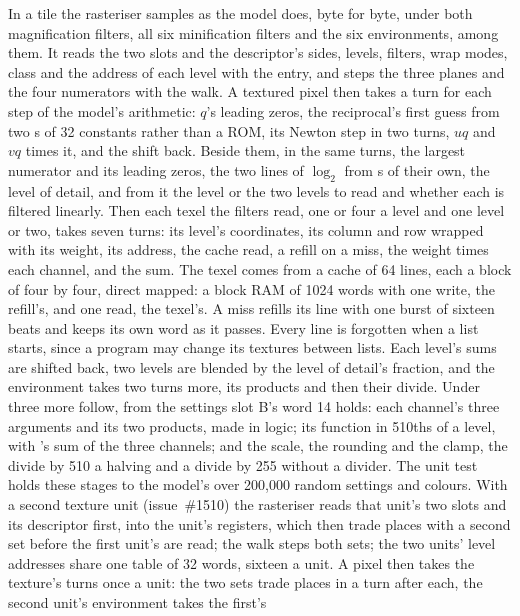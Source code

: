 \documentclass[journal,9pt]{IEEEtran}
\begin{document}
In a tile the rasteriser samples as the model does, byte for byte,
under both magnification filters, all six minification filters and the
six environments,  among them. It reads the two slots and the descriptor's sides,
levels, filters, wrap modes, class and the address of each level with
the entry, and steps the three planes and the four numerators with the
walk. A textured pixel then takes a turn for each step of the model's
arithmetic: $q$'s leading zeros, the reciprocal's first guess from two
s of 32 constants rather than a ROM, its Newton step in
two turns, $uq$ and $vq$ times it, and the shift back. Beside them, in
the same turns, the largest numerator and its leading zeros, the two
lines of $\log_2$ from s of their own, the level of
detail, and from it the level or the two levels to read and whether
each is filtered linearly. Then each texel the filters read, one or four
a level and one level or two, takes seven turns: its level's
coordinates, its column and row wrapped with its weight, its address,
the cache read, a refill on a miss, the weight times each channel, and
the sum. The texel comes from a cache of 64 lines, each a block of four
by four, direct mapped: a block RAM of 1024 words with one write, the
refill's, and one read, the texel's. A miss refills its line with one
burst of sixteen beats and keeps its own word as it passes. Every line
is forgotten when a list starts, since a program may change its
textures between lists. Each level's sums are shifted back, two levels
are blended by the level of detail's fraction, and the environment
takes two turns more, its products and then their divide. Under
 three more follow, from the settings slot B's word 14
holds: each channel's three arguments and its two products, made in
logic; its function in 510ths of a level, with 's sum of the
three channels; and the scale, the rounding and the clamp, the divide by
510 a halving and a divide by 255 without a divider. The unit test
 holds these stages to
the model's  over 200,000 random settings and colours.
With a second texture unit (issue~\#1510) the rasteriser reads that
unit's two slots and its descriptor first, into the unit's registers,
which then trade places with a second set before the first unit's are
read; the walk steps both sets; the two units'
level addresses share one table of 32 words, sixteen a unit. A pixel
then takes the texture's turns once a unit: the two sets trade places in
a turn after each, the second unit's environment takes the first's
\end{document}
